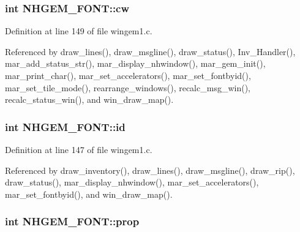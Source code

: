 \hypertarget{structNHGEM__FONT_a52fa9ddaf433bd36c35baa45d03abb74}{
\subsubsection[{cw}]{\setlength{\rightskip}{0pt plus 5cm}int N\+H\+G\+E\+M\+\_\+\+F\+O\+N\+T\+::cw}}\label{structNHGEM__FONT_a52fa9ddaf433bd36c35baa45d03abb74}


Definition at line 149 of file wingem1.\+c.



Referenced by draw\+\_\+lines(), draw\+\_\+msgline(), draw\+\_\+status(), Inv\+\_\+\+Handler(), mar\+\_\+add\+\_\+status\+\_\+str(), mar\+\_\+display\+\_\+nhwindow(), mar\+\_\+gem\+\_\+init(), mar\+\_\+print\+\_\+char(), mar\+\_\+set\+\_\+accelerators(), mar\+\_\+set\+\_\+fontbyid(), mar\+\_\+set\+\_\+tile\+\_\+mode(), rearrange\+\_\+windows(), recalc\+\_\+msg\+\_\+win(), recalc\+\_\+status\+\_\+win(), and win\+\_\+draw\+\_\+map().

\hypertarget{structNHGEM__FONT_af309e5f1e08051eec82df301c1676da6}{
\subsubsection[{id}]{\setlength{\rightskip}{0pt plus 5cm}int N\+H\+G\+E\+M\+\_\+\+F\+O\+N\+T\+::id}}\label{structNHGEM__FONT_af309e5f1e08051eec82df301c1676da6}


Definition at line 147 of file wingem1.\+c.



Referenced by draw\+\_\+inventory(), draw\+\_\+lines(), draw\+\_\+msgline(), draw\+\_\+rip(), draw\+\_\+status(), mar\+\_\+display\+\_\+nhwindow(), mar\+\_\+set\+\_\+accelerators(), mar\+\_\+set\+\_\+fontbyid(), and win\+\_\+draw\+\_\+map().

\hypertarget{structNHGEM__FONT_ab44ccf5b3d4e4e9c7f3bfb97bf597ed3}{
\subsubsection[{prop}]{\setlength{\rightskip}{0pt plus 5cm}int N\+H\+G\+E\+M\+\_\+\+F\+O\+N\+T\+::prop}}\label{structNHGEM__FONT_ab44ccf5b3d4e4e9c7f3bfb97bf597ed3}


